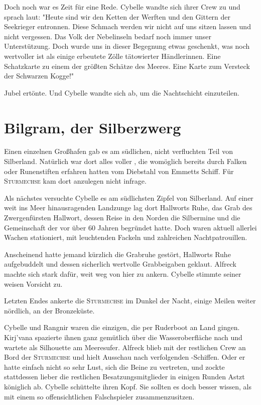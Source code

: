 Doch noch war es Zeit für eine Rede. Cybelle wandte sich ihrer Crew zu und sprach laut: "Heute sind wir den Ketten der Werften und den Gittern der Seekrieger entronnen. Diese Schmach werden wir nicht auf uns sitzen lassen und nicht vergessen. Das Volk der Nebelinseln bedarf noch immer unser Unterstützung. Doch wurde uns in dieser Begegnung etwas geschenkt, was noch wertvoller ist als einige erbeutete Zölle tätowierter Händlerinnen. Eine Schatzkarte zu einem der größten Schätze des Meeres. Eine Karte zum Versteck der Schwarzen Kogge!"

Jubel ertönte. Und Cybelle wandte sich ab, um die Nachtschicht einzuteilen.





\newpage
\section{Bilgram, der Silberzwerg}

Einen einzelnen Großhafen gab es am südlichen, nicht verfluchten Teil von Silberland. Natürlich war dort alles voller , die womöglich bereits durch Falken oder Runenstiften erfahren hatten vom Diebstahl von Emmetts Schiff. Für \textsc{Sturmechse} kam dort anzulegen nicht infrage.

Als nächstes versuchte Cybelle es am südlichsten Zipfel von Silberland. Auf einer weit ins Meer hinausragenden Landzunge lag dort Hallworts Ruhe, das Grab des Zwergenfürsten Hallwort, dessen Reise in den Norden die Silbermine und die Gemeinschaft der  vor über 60 Jahren begründet hatte. Doch waren aktuell allerlei Wachen stationiert, mit leuchtenden Fackeln und zahlreichen Nachtpatrouillen. 

Anscheinend hatte jemand kürzlich die Grabruhe gestört, Hallworts Ruhe aufgebuddelt und dessen sicherlich wertvolle Grabbeigaben geklaut. Alfreck machte sich stark dafür, weit weg von hier zu ankern. Cybelle stimmte seiner weisen Vorsicht zu.

Letzten Endes ankerte die \textsc{Sturmechse} im Dunkel der Nacht, einige Meilen weiter nördlich, an der Bronzeküste.

Cybelle und Rangnir waren die einzigen, die per Ruderboot an Land gingen. Kirj'vana spazierte ihnen ganz gemütlich über die Wasseroberfläche nach und wartete als Silhouette am Meeresufer. Alfreck blieb mit der restlichen Crew an Bord der \textsc{Sturmechse} und hielt Ausschau nach verfolgenden -Schiffen. Oder er hatte einfach nicht so sehr Lust, sich die Beine zu vertreten, und zockte stattdessen lieber die restlichen Besatzungsmitglieder in einigen Runden Astzt königlich ab. Cybelle schüttelte ihren Kopf. Sie sollten es doch besser wissen, als mit einem so offensichtlichen Falschspieler zusammenzusitzen.

